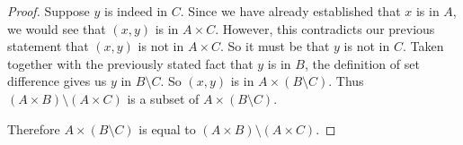 \documentclass[main.tex]{subfiles}
\begin{document}
\begin{proof}
	Suppose \(y\) is indeed in \(C\). Since we have already established that
	\(x\) is in \(A\), we would see that \((x,y)\) is in \(A \times C\).
	However, this contradicts our previous statement that \((x,y)\) is not
	in \(A \times C\). So it must be that \(y\) is not in \(C\). Taken
	together with the previously stated fact that \(y\) is in \(B\), the
	definition of set difference gives us \(y\) in \(B \setminus C\). So
	\((x,y)\) is in \(A \times (B \setminus C)\). Thus
	\((A \times B) \setminus (A \times C)\) is a subset of
	\(A \times (B \setminus C)\).

	\medskip
	Therefore \(A \times (B \setminus C)\) is equal to
	\((A \times B) \setminus (A \times C)\).
\end{proof}
\end{document}
